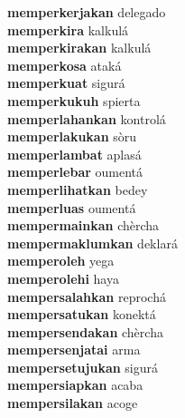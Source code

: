 \textbf{memperkerjakan } delegado \\
\textbf{memperkira } kalkulá \\
\textbf{memperkirakan } kalkulá \\
\textbf{memperkosa } ataká \\
\textbf{memperkuat } sigurá \\
\textbf{memperkukuh } spierta \\
\textbf{memperlahankan } kontrolá \\
\textbf{memperlakukan } sòru \\
\textbf{memperlambat } aplasá \\
\textbf{memperlebar } oumentá \\
\textbf{memperlihatkan } bedey \\
\textbf{memperluas } oumentá \\
\textbf{mempermainkan } chèrcha \\
\textbf{mempermaklumkan } deklará \\
\textbf{memperoleh } yega \\
\textbf{memperolehi } haya \\
\textbf{mempersalahkan } reprochá \\
\textbf{mempersatukan } konektá \\
\textbf{mempersendakan } chèrcha \\
\textbf{mempersenjatai } arma \\
\textbf{mempersetujukan } sigurá \\
\textbf{mempersiapkan } acaba \\
\textbf{mempersilakan } acoge \\
